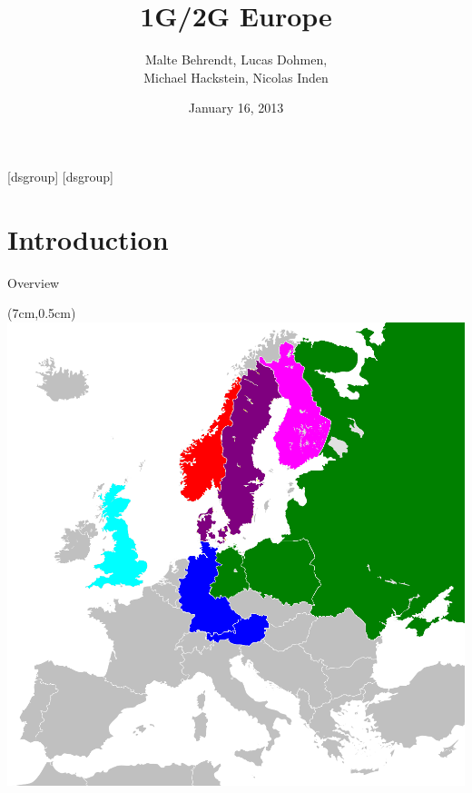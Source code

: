 \documentclass[10pt]{beamer}
\title{1G/2G Europe}
\subtitle{}
\author{Malte Behrendt, Lucas Dohmen,\\Michael Hackstein, Nicolas Inden}
\institute{Development of IT Standards}
\date{January 16, 2013}
\begin{document}


\frame{\titlepage} 




[dsgroup]
[dsgroup]
\setcounter{page}{1} 

\section{Introduction}
\begin{frame}{Overview}
  \textblockorigin{0.0cm}{2.0cm}
  \tableofcontents[currentsection]
  
  \begin{textblock*}{6cm}(7cm,0.5cm)
   \includegraphics[width=1\columnwidth]{./pictures/0GNetworkStandards.png}
  \end{textblock*}
\end{frame}

\end{document}
